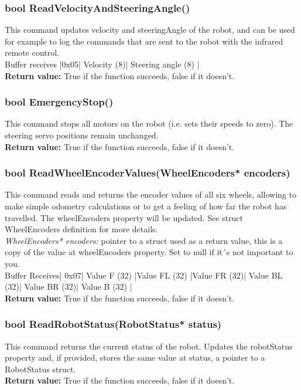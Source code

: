 \documentclass{book}
\begin{document}
\subsubsection{bool ReadVelocityAndSteeringAngle()}
This command updates velocity and steeringAngle of the robot, and can be used for example to log the commands that are sent to the robot with the infrared remote control.\\
Buffer receives |0x05| Velocity (8)| Steering angle (8) |\\
\textbf{Return value: }True if the function succeeds, false if it doesn't.\\ 

\subsubsection{bool EmergencyStop()}
This command stops all motors on the robot (i.e. sets their speeds to zero). The steering servo positions remain unchanged.\\
\textbf{Return value: }True if the function succeeds, false if it doesn't.\\ 

\subsubsection{	bool ReadWheelEncoderValues(WheelEncoders* encoders)}
This command reads and returns the encoder values of all six wheels, allowing to make simple odometry calculations or to get a feeling of how far the robot has travelled. The wheelEncoders property will be updated. See struct WheelEncoders definition for more details.\\
\textit{WheelEncoders* encoders:} pointer to a struct used as a return value, this is a copy of the value at wheelEncoders property. Set to null if it´s not important to you.\\
Buffer Receives| 0x07| Value F (32) |Value FL (32) |Value FR (32)| Value BL (32)| Value BR (32)| Value B (32) |\\
\textbf{Return value: }True if the function succeeds, false if it doesn't.\\ 

\subsubsection{bool ReadRobotStatus(RobotStatus* status)}
This command returns the current status of the robot. Updates the robotStatus property and, if provided, stores the same value at status, a pointer to a RobotStatus struct.\\
\textbf{Return value: }True if the function succeeds, false if it doesn't.\\ 
\end{document}

